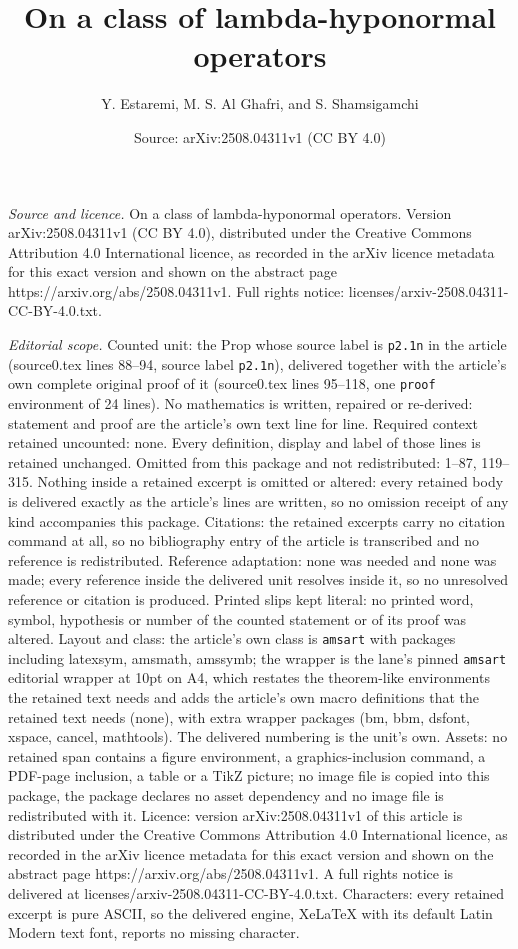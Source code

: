 \documentclass[10pt,a4paper]{amsart}
\title[On a class of lambda-hyponormal operators]{On a class of lambda-hyponormal operators}
\author{Y. Estaremi, M. S. Al Ghafri, and S. Shamsigamchi}
\date{Source: arXiv:2508.04311v1 (CC BY 4.0)}
\begin{document}
\maketitle

\noindent\emph{Source and licence.} On a class of lambda-hyponormal operators. Version arXiv:2508.04311v1 (CC BY 4.0), distributed under the Creative Commons Attribution 4.0 International licence, as recorded in the arXiv licence metadata for this exact version and shown on the abstract page https://arxiv.org/abs/2508.04311v1. Full rights notice: licenses/arxiv-2508.04311-CC-BY-4.0.txt.\par\smallskip

\noindent\textit{Editorial scope.} Counted unit: the Prop whose source label is \texttt{p2.1n} in the article (source0.tex lines 88--94, source label \texttt{p2.1n}), delivered together with the article's own complete original proof of it (source0.tex lines 95--118, one \texttt{proof} environment of 24 lines). No mathematics is written, repaired or re-derived: statement and proof are the article's own text line for line. Required context retained uncounted: none. Every definition, display and label of those lines is retained unchanged. Omitted from this package and not redistributed: 1--87, 119--315. Nothing inside a retained excerpt is omitted or altered: every retained body is delivered exactly as the article's lines are written, so no omission receipt of any kind accompanies this package. Citations: the retained excerpts carry no citation command at all, so no bibliography entry of the article is transcribed and no reference is redistributed. Reference adaptation: none was needed and none was made; every reference inside the delivered unit resolves inside it, so no unresolved reference or citation is produced. Printed slips kept literal: no printed word, symbol, hypothesis or number of the counted statement or of its proof was altered. Layout and class: the article's own class is \texttt{amsart} with packages including latexsym, amsmath, amssymb; the wrapper is the lane's pinned \texttt{amsart} editorial wrapper at 10pt on A4, which restates the theorem-like environments the retained text needs and adds the article's own macro definitions that the retained text needs (none), with extra wrapper packages (bm, bbm, dsfont, xspace, cancel, mathtools). The delivered numbering is the unit's own. Assets: no retained span contains a figure environment, a graphics-inclusion command, a PDF-page inclusion, a table or a TikZ picture; no image file is copied into this package, the package declares no asset dependency and no image file is redistributed with it. Licence: version arXiv:2508.04311v1 of this article is distributed under the Creative Commons Attribution 4.0 International licence, as recorded in the arXiv licence metadata for this exact version and shown on the abstract page https://arxiv.org/abs/2508.04311v1. A full rights notice is delivered at licenses/arxiv-2508.04311-CC-BY-4.0.txt. Characters: every retained excerpt is pure ASCII, so the delivered engine, XeLaTeX with its default Latin Modern text font, reports no missing character.
\end{document}

